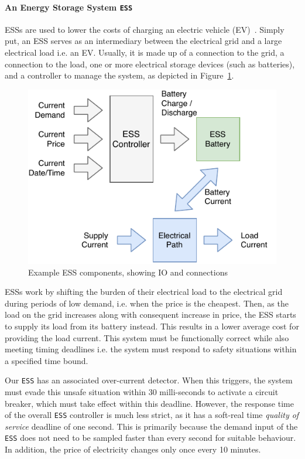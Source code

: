 \paragraph{An Energy Storage System \texttt{ESS}}
\label{sec:ess}
\acfp{ESS} are used to lower the costs of
charging an electric vehicle (EV)~\cite{chaudhari2017hybrid}. %
Simply put, an \ac{ESS} serves as an intermediary between the electrical grid and a large electrical load i.e. an EV.
Usually, it is made up of a connection to the grid, a connection to
the load, one or more electrical storage devices (such as batteries), and a controller to manage the system, as 
depicted in Figure~\ref{fig:ess-components}.

\begin{figure}[h]
	\vspace{-3mm}
	\centering
	\includegraphics[scale=0.8]{Content/fig/ess_components}
	\caption{Example \ac{ESS} components, showing IO and connections\label{fig:ess-components}}
\end{figure}

\acp{ESS} work by shifting the burden of their electrical load to the
electrical grid during periods of low demand, i.e. when the price is the cheapest.
Then, as the load on the grid increases along with consequent increase
in price, the \ac{ESS} starts to supply its load from its battery instead. 
This results in a lower average cost for providing the load current. 
This system must be functionally correct while also meeting timing
deadlines i.e.
the system must respond to safety situations within a specified time bound. 

Our \texttt{ESS} has an associated
over-current detector.  When this triggers, the system must evade this
unsafe situation within 30 milli-seconds to activate a circuit
breaker, which must take effect within this deadline. 
However, the response time of the overall \texttt{ESS} controller is much less strict, as it has a soft-real time \textit{quality of service} deadline of one second.
This is primarily because the demand input of the \texttt{ESS} does not need to be sampled faster than every second for suitable behaviour.
In addition, the price of electricity changes only once every 10 minutes.

